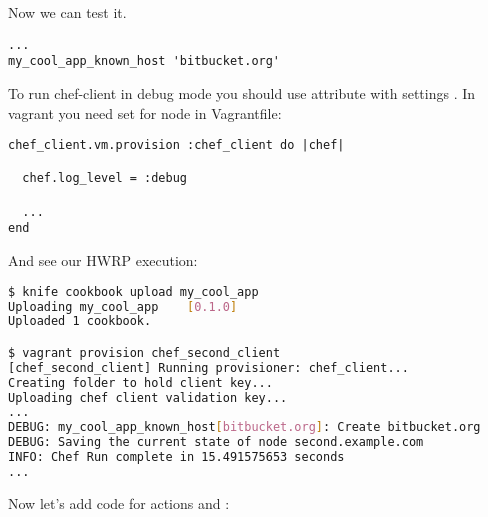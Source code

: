 Now we can test it.

\begin{lstlisting}[label=lst:cookbook-hwrp8]
...
my_cool_app_known_host 'bitbucket.org'
\end{lstlisting}

To run chef-client in debug mode you should use  attribute with settings . In vagrant you need set  for node in Vagrantfile:

\begin{lstlisting}[label=lst:cookbook-hwrp9]
chef_client.vm.provision :chef_client do |chef|

  chef.log_level = :debug

  ...
end
\end{lstlisting}

And see our HWRP execution:

\begin{lstlisting}[language=Bash,label=lst:cookbook-hwrp10]
$ knife cookbook upload my_cool_app
Uploading my_cool_app    [0.1.0]
Uploaded 1 cookbook.

$ vagrant provision chef_second_client
[chef_second_client] Running provisioner: chef_client...
Creating folder to hold client key...
Uploading chef client validation key...
...
DEBUG: my_cool_app_known_host[bitbucket.org]: Create bitbucket.org
DEBUG: Saving the current state of node second.example.com
INFO: Chef Run complete in 15.491575653 seconds
...
\end{lstlisting}

Now let's add code for actions  and :

